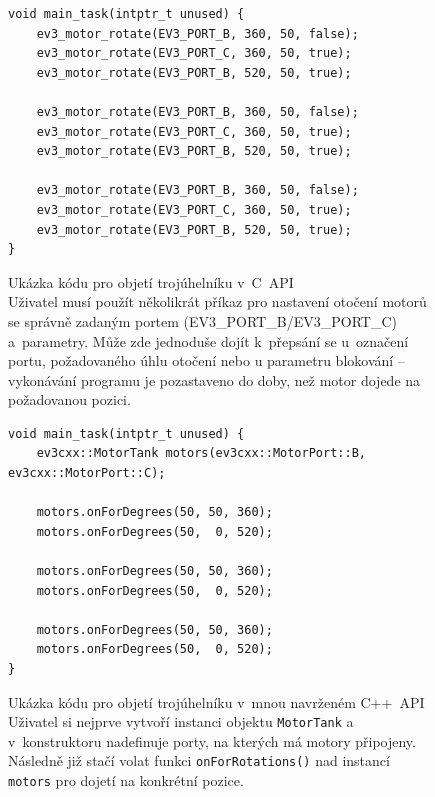 \begin{figure}[H] 
    \begin{verbatim}
void main_task(intptr_t unused) {   
    ev3_motor_rotate(EV3_PORT_B, 360, 50, false);
    ev3_motor_rotate(EV3_PORT_C, 360, 50, true);
    ev3_motor_rotate(EV3_PORT_B, 520, 50, true);
    
    ev3_motor_rotate(EV3_PORT_B, 360, 50, false);
    ev3_motor_rotate(EV3_PORT_C, 360, 50, true);
    ev3_motor_rotate(EV3_PORT_B, 520, 50, true);
    
    ev3_motor_rotate(EV3_PORT_B, 360, 50, false);
    ev3_motor_rotate(EV3_PORT_C, 360, 50, true);
    ev3_motor_rotate(EV3_PORT_B, 520, 50, true);
}
    \end{verbatim}
    \caption[Ukázka kódu pro objetí trojúhelníku v~C~API]{
    Ukázka kódu pro objetí trojúhelníku v~C~API \\
    Uživatel musí použít několikrát příkaz pro nastavení otočení motorů se správně zadaným portem (EV3\_PORT\_B/EV3\_PORT\_C) a~parametry. 
    Může zde jednoduše dojít k~přepsání se u~označení portu, požadovaného úhlu otočení nebo u parametru blokování -- vykonávání programu je pozastaveno do doby, než motor dojede na požadovanou pozici. 
% 
% 
    }
    \label{src:ev3api-triangle}
\end{figure}


\begin{figure}[H] 
    \begin{verbatim}
void main_task(intptr_t unused) {    
    ev3cxx::MotorTank motors(ev3cxx::MotorPort::B, ev3cxx::MotorPort::C);   
    
    motors.onForDegrees(50, 50, 360);
    motors.onForDegrees(50,  0, 520);

    motors.onForDegrees(50, 50, 360);
    motors.onForDegrees(50,  0, 520); 

    motors.onForDegrees(50, 50, 360);
    motors.onForDegrees(50,  0, 520);
}
    \end{verbatim}
    \caption[Ukázka kódu pro objetí trojúhelníku v~mnou navrženém C++~API]{Ukázka kódu pro objetí trojúhelníku v~mnou navrženém C++~API \\
    Uživatel si nejprve vytvoří instanci objektu \texttt{MotorTank} a v~konstruktoru nadefinuje porty, na kterých má motory připojeny. 
% 
% 
    Následně již stačí volat funkci \texttt{onForRotations()} nad instancí \texttt{motors} pro dojetí na konkrétní pozice.    
    }
    \label{src:ev3cxx-triangle}
\end{figure}

